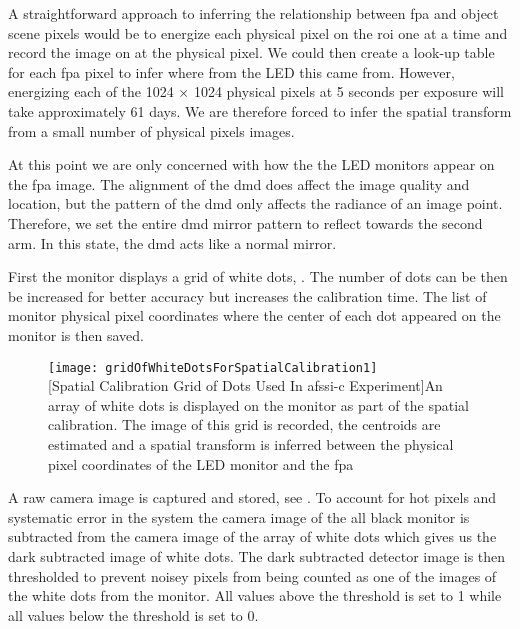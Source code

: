 A straightforward approach to inferring the relationship between \gls{fpa} and object scene pixels would be to energize each physical pixel on the \gls{roi} one at a time and record the image on at the physical pixel. We could then create a look-up table for each \gls{fpa} pixel to infer where from the LED this came from. However, energizing each of the 1024 $\times$ 1024 physical pixels at 5 seconds per exposure will take approximately 61 days. We are therefore forced to infer the spatial transform from a small number of physical pixels images.

At this point we are only concerned with how the the LED monitors appear on the \gls{fpa} image. The alignment of the \gls{dmd} does affect the image quality and location, but the pattern of the \gls{dmd} only affects the radiance of an image point. Therefore, we set the entire \gls{dmd} mirror pattern to reflect towards the second arm. In this state, the \gls{dmd} acts like a normal mirror. 

First the monitor displays a grid of white dots, . The number of dots can be then be increased for better accuracy but increases the calibration time. The list of monitor physical pixel coordinates where the center of each dot appeared on the monitor is then saved.

\begin{figure}[htb]
	\centering
	\texttt{[image: gridOfWhiteDotsForSpatialCalibration1]}\\
	[Spatial Calibration Grid of Dots Used In \gls{afssi-c} Experiment]{An array of white dots is displayed on the monitor as part of the spatial calibration. The image of this grid is recorded, the centroids are estimated and a spatial transform is inferred between the physical pixel coordinates of the LED monitor and the \gls{fpa}}
	\label{fig:gridOfWhiteDotsForSpatialCalibration1}
\end{figure}

A raw camera image is captured and stored, see . To account for hot pixels and systematic error in the system the camera image of the all black monitor is subtracted from the camera image of the array of white dots which gives us the dark subtracted image of white dots. The dark subtracted detector image is then thresholded to prevent noisey pixels from being counted as one of the images of the white dots from the monitor. All values above the threshold is set to 1 while all values below the threshold is set to 0.

